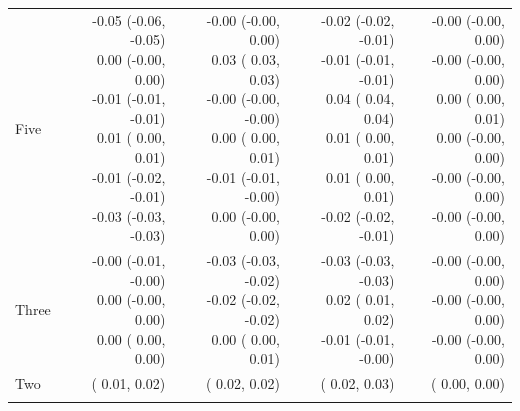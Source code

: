 \documentclass[12pt,PhD,twoside,openright]{muthesis}
\begin{document}
\begin{table}[!h]
\begin{tabular}[t]{l>{\ttfamily}r>{\ttfamily}r>{\ttfamily}r>{\ttfamily}r}
\hspace{1em}Five & \makecell[l]{-0.05 (-0.06, -0.05)\\  0.00 (-0.00,  0.00)\\ -0.01 (-0.01, -0.01)\\  0.01 ( 0.00,  0.01)\\ -0.01 (-0.02, -0.01)\\ -0.03 (-0.03, -0.03)} & \makecell[l]{-0.00 (-0.00,  0.00)\\  0.03 ( 0.03,  0.03)\\ -0.00 (-0.00, -0.00)\\  0.00 ( 0.00,  0.01)\\ -0.01 (-0.01, -0.00)\\  0.00 (-0.00,  0.00)} & \makecell[l]{-0.02 (-0.02, -0.01)\\ -0.01 (-0.01, -0.01)\\  0.04 ( 0.04,  0.04)\\  0.01 ( 0.00,  0.01)\\  0.01 ( 0.00,  0.01)\\ -0.02 (-0.02, -0.01)} & \makecell[l]{-0.00 (-0.00,  0.00)\\ -0.00 (-0.00,  0.00)\\  0.00 ( 0.00,  0.01)\\  0.00 (-0.00,  0.00)\\ -0.00 (-0.00,  0.00)\\ -0.00 (-0.00,  0.00)}\\
\hspace{1em}Three & \makecell[l]{-0.00 (-0.01, -0.00)\\  0.00 (-0.00,  0.00)\\  0.00 ( 0.00,  0.00)} & \makecell[l]{-0.03 (-0.03, -0.02)\\ -0.02 (-0.02, -0.02)\\  0.00 ( 0.00,  0.01)} & \makecell[l]{-0.03 (-0.03, -0.03)\\  0.02 ( 0.01,  0.02)\\ -0.01 (-0.01, -0.00)} & \makecell[l]{-0.00 (-0.00,  0.00)\\ -0.00 (-0.00,  0.00)\\ -0.00 (-0.00,  0.00)}\\
\rowcolor{gray!6}  \hspace{1em}Two & 0.01 ( 0.01,  0.02) & 0.02 ( 0.02,  0.02) & 0.02 ( 0.02,  0.03) & 0.00 ( 0.00,  0.00)\\
\addlinespace[0.3em]
\multicolumn{5}{l}{\textbf{Slope}}\\

\end{tabular}
\end{table}
\end{document}
